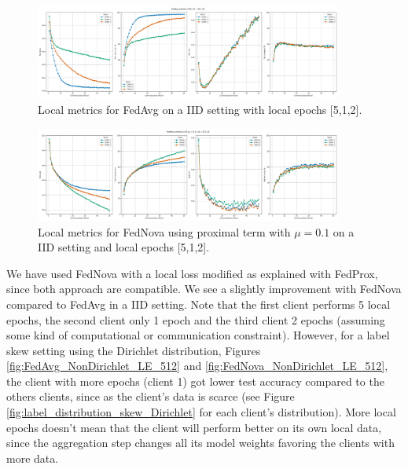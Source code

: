 \begin{figure}[H]
  \centering
  \includegraphics[width=0.9\textwidth]{figures/2-Federated_Learning/FedAvg_IID_LE_512.png}
  \caption{Local metrics for FedAvg on a IID setting with local epochs [5,1,2].}
  \label{fig:FedAvg_IID_LE_512}
\end{figure}


\begin{figure}[H]
  \centering
  \includegraphics[width=0.9\textwidth]{figures/2-Federated_Learning/FedNova_IID_LE_512.png}
  \caption{Local metrics for FedNova using proximal term with $\mu=0.1$ on a IID setting and local epochs [5,1,2].}
  \label{fig:FedNova_IID_LE_512}
\end{figure}

We have used FedNova with a local loss modified as explained with FedProx, since both approach are compatible. We see a slightly improvement with FedNova compared to FedAvg in a IID setting. Note that the first client performs 5 local epochs, the second client only 1 epoch and the third client 2 epochs (assuming some kind of computational or communication constraint). However, for a label skew setting using the Dirichlet distribution, Figures \ref{fig:FedAvg_NonDirichlet_LE_512} and \ref{fig:FedNova_NonDirichlet_LE_512}, the client with more epochs (client 1) got lower test accuracy compared to the others clients, since as the client's data is scarce (see Figure \ref{fig:label_distribution_skew_Dirichlet} for each client's distribution). More local epochs doesn't mean that the client will perform better on its own local data, since the aggregation step changes all its model weights favoring the clients with more data.



